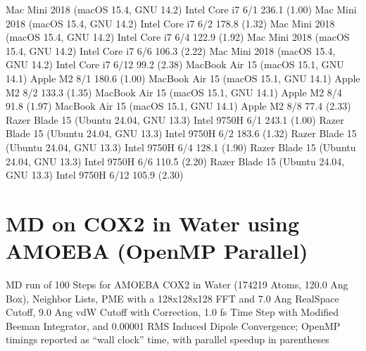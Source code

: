 \documentclass[letterpaper,11pt,english]{sphinxmanual}
\begin{document}
\begin{sphinxVerbatim}[commandchars=\\\{\}]
Mac Mini 2018 (macOS 15.4, GNU 14.2)      Intel Core i7       6/1       236.1 (1.00)
Mac Mini 2018 (macOS 15.4, GNU 14.2)      Intel Core i7       6/2       178.8 (1.32)
Mac Mini 2018 (macOS 15.4, GNU 14.2)      Intel Core i7       6/4       122.9 (1.92)
Mac Mini 2018 (macOS 15.4, GNU 14.2)      Intel Core i7       6/6       106.3 (2.22)
Mac Mini 2018 (macOS 15.4, GNU 14.2)      Intel Core i7      6/12        99.2 (2.38)
MacBook Air 15 (macOS 15.1, GNU 14.1)        Apple M2         8/1       180.6 (1.00)
MacBook Air 15 (macOS 15.1, GNU 14.1)        Apple M2         8/2       133.3 (1.35)
MacBook Air 15 (macOS 15.1, GNU 14.1)        Apple M2         8/4        91.8 (1.97)
MacBook Air 15 (macOS 15.1, GNU 14.1)        Apple M2         8/8        77.4 (2.33)
Razer Blade 15 (Ubuntu 24.04, GNU 13.3)    Intel 9750H        6/1       243.1 (1.00)
Razer Blade 15 (Ubuntu 24.04, GNU 13.3)    Intel 9750H        6/2       183.6 (1.32)
Razer Blade 15 (Ubuntu 24.04, GNU 13.3)    Intel 9750H        6/4       128.1 (1.90)
Razer Blade 15 (Ubuntu 24.04, GNU 13.3)    Intel 9750H        6/6       110.5 (2.20)
Razer Blade 15 (Ubuntu 24.04, GNU 13.3)    Intel 9750H       6/12       105.9 (2.30)
\end{sphinxVerbatim}


\section{MD on COX\sphinxhyphen{}2 in Water using AMOEBA (OpenMP Parallel)}
\label{\detokenize{text/benchmarks:md-on-cox-2-in-water-using-amoeba-openmp-parallel}}
\sphinxAtStartPar
MD run of 100 Steps for AMOEBA COX\sphinxhyphen{}2 in Water (174219 Atoms, 120.0 Ang Box), Neighbor Lists, PME with a 128x128x128 FFT and 7.0 Ang Real\sphinxhyphen{}Space Cutoff, 9.0 Ang vdW Cutoff with Correction, 1.0 fs Time Step with Modified Beeman Integrator, and 0.00001 RMS Induced Dipole Convergence; OpenMP timings reported as “wall clock” time, with parallel speedup in parentheses

\sphinxAtStartPar
{}
\end{document}
